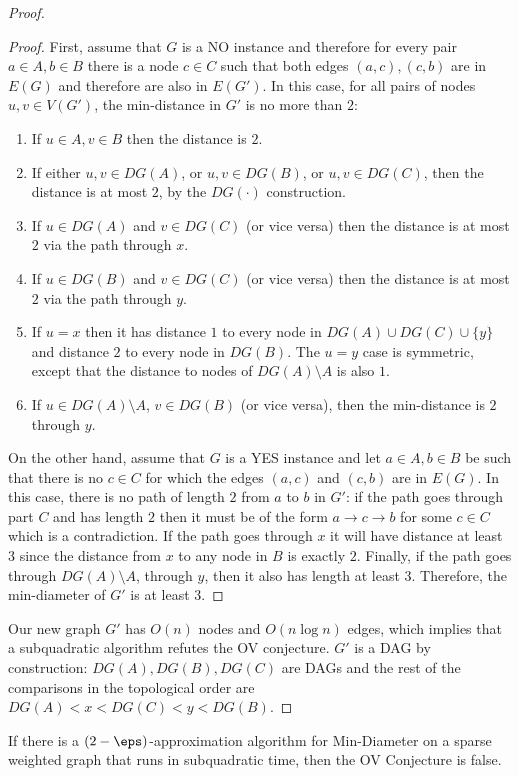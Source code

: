 \begin{proof}
\begin{proof}
First, assume that $G$ is a NO instance and therefore for every pair $a\in A,b \in B$ there is a node $c \in C$ such that both edges $(a,c),(c,b)$ are in $E(G)$ and therefore are also in $E(G')$.
In this case, for all pairs of nodes $u,v \in V(G')$, the min-distance in $G'$ is no more than $2$:
\begin{enumerate} 
\item If $u \in A, v \in B$ then the distance is $2$.
\item If either $u,v \in DG(A)$, or $u,v\in DG(B)$, or $u,v\in DG(C)$, then the distance is at most $2$, by the $DG(\cdot)$ construction.
\item If $u \in DG(A)$ and $v \in DG(C)$ (or vice versa) then the distance is at most $2$ via the path through $x$.
\item If $u \in DG(B)$ and $v \in DG(C)$ (or vice versa) then the distance is at most $2$ via the path through $y$.
\item If $u=x$ then it has distance $1$ to every node in $DG(A) \cup DG(C) \cup \{y\}$ and distance $2$ to every node in $DG(B)$. The $u=y$ case is symmetric, except that the distance to nodes of $DG(A)\setminus A$ is also $1$.
\item If $u\in DG(A)\setminus A$, $v\in DG(B)$ (or vice versa), then the min-distance is $2$ through $y$.
\end{enumerate}
On the other hand, assume that $G$ is a YES instance and let $a\in A, b \in B$ be such that there is no $c \in C$ for which the edges $(a,c)$ and $(c,b)$ are in $E(G)$. 
In this case, there is no path of length $2$ from $a$ to $b$ in $G'$: if the path goes through part $C$ and has length $2$ then it must be of the form $a \to c \to b$ for some $c \in C$ which is a contradiction. If the path goes through $x$ it will have distance at least $3$ since the distance from $x$ to any node in $B$ is exactly $2$.
Finally, if the path goes through $DG(A)\setminus A$, through $y$, then it also has length at least $3$.
Therefore, the min-diameter of $G'$ is at least $3$.
\end{proof}
Our new graph $G'$ has $O(n)$ nodes and $O(n\log{n})$ edges, which implies that a subquadratic algorithm refutes the OV conjecture. 
$G'$ is a DAG by construction: $DG(A), DG(B),DG(C)$ are DAGs and the rest of the comparisons in the topological order are $DG(A)<x<DG(C)<y<DG(B)$.
\end{proof}
\begin{lemma}
\label{lem:MinDiam}
If there is a $(2-\eps)$-approximation algorithm for Min-Diameter on a sparse weighted graph that runs in subquadratic time, then the OV Conjecture is false.
\end{lemma}

